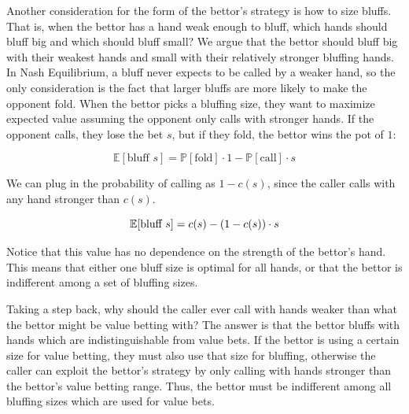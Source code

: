 \documentclass[a4paper,12pt]{article}
\theoremstyle{plain}
\theoremstyle{definition}
\begin{document}
Another consideration for the form of the bettor's strategy is how to size bluffs. That is, when the bettor has a hand weak enough to bluff, which hands should bluff big and which should bluff small? We argue that the bettor should bluff big with their weakest hands and small with their relatively stronger bluffing hands. In Nash Equilibrium, a bluff never expects to be called by a weaker hand, so the only consideration is the fact that larger bluffs are more likely to make the opponent fold. When the bettor picks a bluffing size, they want to maximize expected value assuming the opponent only calls with stronger hands. If the opponent calls, they lose the bet $s$, but if they fold, the bettor wins the pot of $1$:

\[ \mathbb{E}[\text{bluff } s] = \mathbb{P}[\text{fold}] \cdot 1 -\mathbb{P}[\text{call}] \cdot s \]

We can plug in the probability of calling as $1-c(s)$, since the caller calls with any hand stronger than $c(s)$.

\begin{equation}{\label{eq:bluff}}
    \mathbb{E}[\text{bluff } s] = c(s) - (1-c(s)) \cdot s
\end{equation}

Notice that this value has no dependence on the strength of the bettor's hand. This means that either one bluff size is optimal for all hands, or that the bettor is indifferent among a set of bluffing sizes. 

Taking a step back, why should the caller ever call with hands weaker than what the bettor might be value betting with? The answer is that the bettor bluffs with hands which are indistinguishable from value bets. If the bettor is using a certain size for value betting, they must also use that size for bluffing, otherwise the caller can exploit the bettor's strategy by only calling with hands stronger than the bettor's value betting range. Thus, the bettor must be indifferent among all bluffing sizes which are used for value bets.
\end{document}
